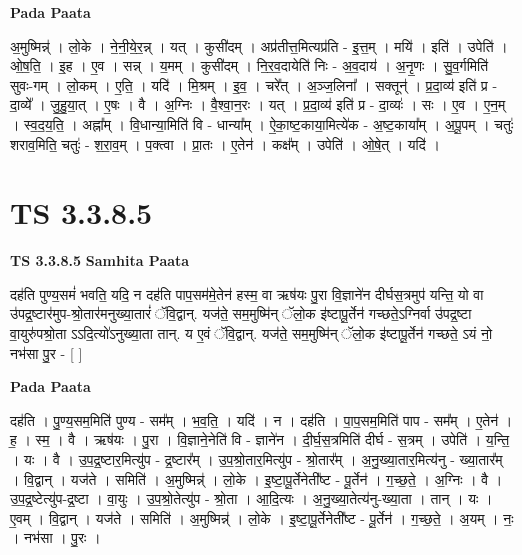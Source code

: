 \documentclass[17pt]{extarticle}
\begin{document}
\textbf{Pada Paata} \newline

अ॒मुष्मिन्न्॑ । लो॒के । ने॒नी॒ये॒र॒न्न् । यत् । कुसी॑दम् । अप्र॑तीत्त॒मित्यप्र॑ति - इ॒त्त॒म् । मयि॑ । इति॑ । उपेति॑ । ओ॒ष॒ति॒ । इ॒ह । ए॒व । सन्न् । य॒मम् । कुसी॑दम् । नि॒र॒व॒दायेति॑ निः - अ॒व॒दाय॑ । अ॒नृ॒णः । सु॒व॒र्गमिति॑ सुवः-गम् । लो॒कम् । ए॒ति॒ । यदि॑ । मि॒श्रम् । इ॒व॒ । चरे᳚त् । अ॒ञ्ज॒लिना᳚ । सक्तून्॑ । प्र॒दा॒व्य॑ इति॑ प्र - दा॒व्ये᳚ । जु॒हु॒या॒त् । ए॒षः । वै । अ॒ग्निः । वै॒श्वा॒न॒रः । यत् । प्र॒दा॒व्य॑ इति॑ प्र - दा॒व्यः॑ । सः । ए॒व । ए॒न॒म् । स्व॒द॒य॒ति॒ । अह्ना᳚म् । वि॒धान्या॒मिति॑ वि - धान्या᳚म् । ऐ॒का॒ष्ट॒काया॒मित्ये॑क - अ॒ष्ट॒काया᳚म् । अ॒पू॒पम् । चतुः॑ शराव॒मिति॒ चतुः॑ - श॒रा॒व॒म् । प॒क्त्वा । प्रा॒तः । ए॒तेन॑ । कक्ष᳚म् । उपेति॑ । ओ॒षे॒त् । यदि॑ ।  \newline





\section{ TS 3.3.8.5 }

\textbf{TS 3.3.8.5 } \newline
\textbf{Samhita Paata} \newline

दह॑ति पुण्य॒समं॑ भवति॒ यदि॒ न दह॑ति पाप॒सम॑मे॒तेन॑ हस्म॒ वा ऋष॑यः पु॒रा वि॒ज्ञाने॑न दीर्घस॒त्रमुप॑ यन्ति॒ यो वा उ॑पद्र॒ष्टार॑मुप-श्रो॒तार॑मनुख्या॒तारं॑ ॅवि॒द्वान्. यज॑ते॒ सम॒मुष्मि॑न् ॅलो॒क इ॑ष्टापू॒र्तेन॑ गच्छते॒ऽग्निर्वा उ॑पद्र॒ष्टा वा॒युरु॑पश्रो॒ता ऽऽदि॒त्यो॑ऽनुख्या॒ता तान्. य ए॒वं ॅवि॒द्वान्. यज॑ते॒ सम॒मुष्मि॑न् ॅलो॒क इ॑ष्टापू॒र्तेन॑ गच्छते॒ ऽयं नो॒ नभ॑सा पु॒र - [  ] \newline

\textbf{Pada Paata} \newline

दह॑ति । पु॒ण्य॒सम॒मिति॑ पुण्य - सम᳚म् । भ॒व॒ति॒ । यदि॑ । न । दह॑ति । पा॒प॒सम॒मिति॑ पाप - सम᳚म् । ए॒तेन॑ । ह॒ । स्म॒ । वै । ऋष॑यः । पु॒रा । वि॒ज्ञाने॒नेति॑ वि - ज्ञाने॑न । दी॒र्घ॒स॒त्रमिति॑ दीर्घ - स॒त्रम् । उपेति॑ । य॒न्ति॒ । यः । वै । उ॒प॒द्र॒ष्टार॒मित्यु॑प - द्र॒ष्टार᳚म् । उ॒प॒श्रो॒तार॒मित्यु॑प - श्रो॒तार᳚म् । अ॒नु॒ख्या॒तार॒मित्य॑नु - ख्या॒तार᳚म् । वि॒द्वान् । यज॑ते । समिति॑ । अ॒मुष्मिन्न्॑ । लो॒के । इ॒ष्टा॒पू॒र्तेनेती᳚ष्ट - पू॒र्तेन॑ । ग॒च्छ॒ते॒ । अ॒ग्निः । वै । उ॒प॒द्र॒ष्टेत्यु॑प-द्र॒ष्टा । वा॒युः । उ॒प॒श्रो॒तेत्यु॑प - श्रो॒ता । आ॒दि॒त्यः । अ॒नु॒ख्या॒तेत्य॑नु-ख्या॒ता । तान् । यः । ए॒वम् । वि॒द्वान् । यज॑ते । समिति॑ । अ॒मुष्मिन्न्॑ । लो॒के । इ॒ष्टा॒पू॒र्तेनेती᳚ष्ट - पू॒र्तेन॑ । ग॒च्छ॒ते॒ । अ॒यम् । नः॒ । नभ॑सा । पु॒रः ।  \newline
\end{document}
